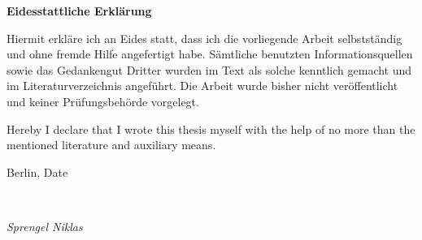 \newpage

\thispagestyle{empty}

\begin{large}
\vspace*{1.4cm}
\noindent
\begin{center}
{\Large \textbf{Eidesstattliche Erkl{\"a}rung}}
\end{center}

\vspace*{0.5cm}

\noindent
Hiermit erkl{\"a}re ich an Eides statt, dass ich die vorliegende Arbeit selbstst{\"a}ndig und ohne fremde Hilfe angefertigt habe. S{\"a}mtliche benutzten Informationsquellen sowie das Gedankengut Dritter wurden im Text als solche kenntlich gemacht und im Literaturverzeichnis angef{\"u}hrt. Die Arbeit wurde bisher nicht ver{\"o}ffentlicht und keiner Pr{\"u}fungsbeh{\"o}rde vorgelegt.
\vspace{2cm}

\noindent
Hereby I declare that I wrote this thesis myself with the help of no more than the mentioned literature and auxiliary means.
\vspace{1cm}

\noindent
Berlin, Date

\vspace{3cm}

\hspace*{7cm}%
\dotfill\\
\hspace*{8.5cm}%
\begin{flushright}
\textit{Sprengel Niklas}
\end{flushright}

\end{large}
